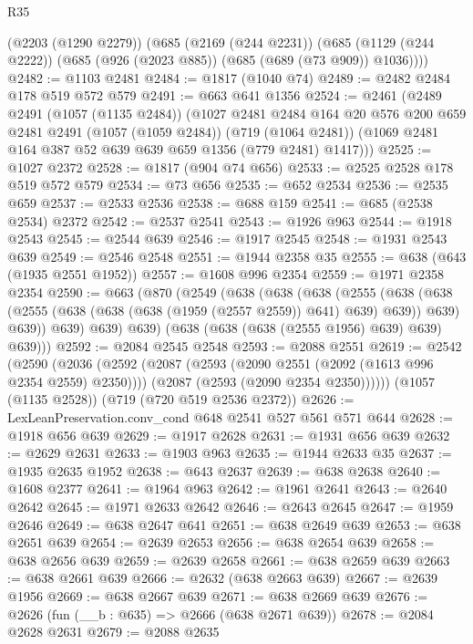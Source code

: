 \begin{lexlean}{R35}
\begin{coremodule}
    (@2203 (@1290 @2279))
    (@685
      (@2169 (@244 @2231))
      (@685 (@1129 (@244 @2222)) (@685 (@926 (@2023 @885)) (@685 (@689 (@73 @909)) @1036))))
@2482 := @1103 @2481
@2484 := @1817 (@1040 @74)
@2489 := @2482 @2484 @178 @519 @572 @579
@2491 := @663 @641 @1356
@2524 := @2461
    (@2489
      @2491
      (@1057 (@1135 @2484))
      (@1027
        @2481
        @2484
        @164
        @20
        @576
        @200
        @659
        @2481
        @2491
        (@1057 (@1059 @2484))
        (@719 (@1064 @2481))
        (@1069 @2481 @164 @387 @52 @639 @639 @659 @1356 (@779 @2481) @1417)))
@2525 := @1027 @2372
@2528 := @1817 (@904 @74 @656)
@2533 := @2525 @2528 @178 @519 @572 @579
@2534 := @73 @656
@2535 := @652 @2534
@2536 := @2535 @659
@2537 := @2533 @2536
@2538 := @688 @159
@2541 := @685 (@2538 @2534) @2372
@2542 := @2537 @2541
@2543 := @1926 @963
@2544 := @1918 @2543
@2545 := @2544 @639
@2546 := @1917 @2545
@2548 := @1931 @2543 @639
@2549 := @2546 @2548
@2551 := @1944 @2358 @35
@2555 := @638 (@643 (@1935 @2551 @1952))
@2557 := @1608 @996 @2354
@2559 := @1971 @2358 @2354
@2590 := @663
    (@870
      (@2549
        (@638
          (@638
            (@638
              (@2555
                (@638
                  (@638 (@2555 (@638 (@638 (@638 (@1959 (@2557 @2559)) @641) @639) @639)) @639)
                  @639))
              @639)
            @639)
          @639)
        (@638 (@638 (@638 (@2555 @1956) @639) @639) @639)))
@2592 := @2084 @2545 @2548
@2593 := @2088 @2551
@2619 := @2542
    (@2590
      (@2036
        (@2592
          (@2087 (@2593 (@2090 @2551 (@2092 (@1613 @996 @2354 @2559) @2350))))
          (@2087 (@2593 (@2090 @2354 @2350))))))
    (@1057 (@1135 @2528))
    (@719 (@720 @519 @2536 @2372))
@2626 := LexLeanPreservation.conv_cond @648 @2541 @527 @561 @571 @644
@2628 := @1918 @656 @639
@2629 := @1917 @2628
@2631 := @1931 @656 @639
@2632 := @2629 @2631
@2633 := @1903 @963
@2635 := @1944 @2633 @35
@2637 := @1935 @2635 @1952
@2638 := @643 @2637
@2639 := @638 @2638
@2640 := @1608 @2377
@2641 := @1964 @963
@2642 := @1961 @2641
@2643 := @2640 @2642
@2645 := @1971 @2633 @2642
@2646 := @2643 @2645
@2647 := @1959 @2646
@2649 := @638 @2647 @641
@2651 := @638 @2649 @639
@2653 := @638 @2651 @639
@2654 := @2639 @2653
@2656 := @638 @2654 @639
@2658 := @638 @2656 @639
@2659 := @2639 @2658
@2661 := @638 @2659 @639
@2663 := @638 @2661 @639
@2666 := @2632 (@638 @2663 @639)
@2667 := @2639 @1956
@2669 := @638 @2667 @639
@2671 := @638 @2669 @639
@2676 := @2626 (fun (__b : @635) => @2666 (@638 @2671 @639))
@2678 := @2084 @2628 @2631
@2679 := @2088 @2635

\end{coremodule}
\end{lexlean}
